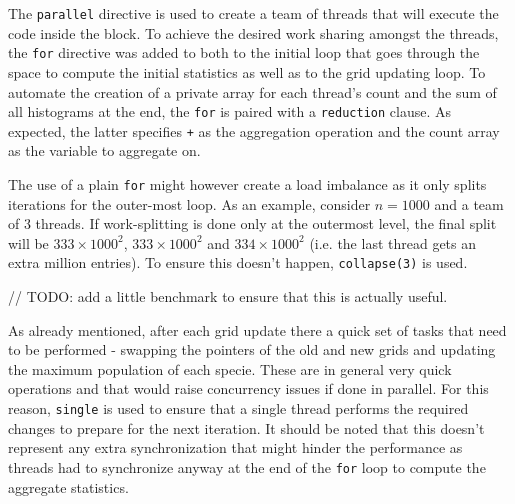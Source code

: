 \documentclass{article}
\begin{document}


The \texttt{parallel} directive is used to create a team of threads 
that will execute the code inside the block. To achieve the desired
work sharing amongst the threads, the \texttt{for} directive was added
to both to the initial loop that goes through the space to compute the initial
statistics as well as to the grid updating loop. To automate the creation
of a private array for each thread's count and the sum of all histograms at
the end, the \texttt{for} is paired with a \texttt{reduction} clause. As expected,
the latter specifies \texttt{+} as the aggregation operation and the count
array as the variable to aggregate on.


The use of a plain \texttt{for} might however create a load imbalance as it
only splits iterations for the outer-most loop. As an example, consider $n=1000$
and a team of 3 threads. If work-splitting is done only at the outermost level,
the final split will be $333 \times 1000^2$, $333 \times 1000^2$ and $334 \times 1000^2$
(i.e. the last thread gets an extra million entries). To ensure this doesn't happen,
\texttt{collapse(3)} is used.

// TODO: add a little benchmark to ensure that this is actually useful.


As already mentioned, after each grid update there a quick set of tasks that
need to be performed - swapping the pointers of the old and new grids and updating 
the maximum population of each specie. These are in general very quick operations
and that would raise concurrency issues if done in parallel. For this reason,
\texttt{single} is used to ensure that a single thread performs the required
changes to prepare for the next iteration. It should be noted that this doesn't
represent any extra synchronization that might hinder the performance as threads
had to synchronize anyway at the end of the \texttt{for} loop to compute the
aggregate statistics.
\end{document}
